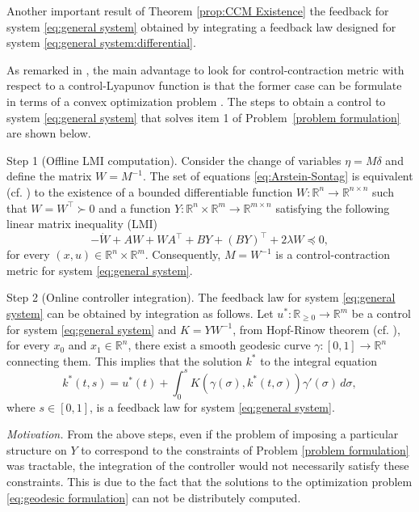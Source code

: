 \documentclass[10pt,twocolumn,twoside]{IEEEtran}
\theoremstyle{plain}
\theoremstyle{definition}
\theoremstyle{remark}
\begin{document}
Another important result of Theorem \ref{prop:CCM Existence} the feedback for system \eqref{eq:general system} obtained by integrating a feedback law designed for system \eqref{eq:general system:differential}.

As remarked in \cite{Manchester2014a}, the main advantage to look for control-contraction metric with respect to a control-Lyapunov function is that the former case can be formulate in terms of a convex optimization problem \cite{Rantzer:2001}. The steps to obtain a control to system \eqref{eq:general system} that solves item 1 of Problem~\ref{problem formulation} are shown below.

Step 1 (Offline LMI computation). Consider the change of variables $\eta=M\delta$ and define the matrix $W=M^{-1}$. The set of equations \eqref{eq:Arstein-Sontag} is equivalent (cf. \cite[Lemma 11.1]{CalafioreGhaoui2014}) to the existence of a bounded differentiable function $W:\mathbb{R}^n\to\mathbb{R}^{n\times n}$ such that $W=W^\top\succ0$ and a function $Y:\mathbb{R}^n\times\mathbb{R}^m\to\mathbb{R}^{m\times n}$ satisfying the following linear matrix inequality (LMI)
\begin{equation}\label{eq:LMI formulation}
	-\dot{W}+AW+WA^\top+BY+(BY)^\top+2\lambda W\preceq0,
\end{equation}
for every $(x,u)\in\mathbb{R}^n\times\mathbb{R}^m$. Consequently, $M=W^{-1}$ is a control-contraction metric for system \eqref{eq:general system}.

Step 2 (Online controller integration). The feedback law for system \eqref{eq:general system} can be obtained by integration as follows. Let $u^\ast:\mathbb{R}_{\geq0}\to\mathbb{R}^m$ be a control for system \eqref{eq:general system} and $K=YW^{-1}$, from Hopf-Rinow theorem (cf. \cite[Theorem 7.7]{Boothby1986}), for every $x_0$ and $x_1\in\mathbb{R}^n$, there exist a smooth geodesic curve $\gamma:[0,1]\to\mathbb{R}^n$ connecting them. This implies that the solution $k^\ast$ to the integral equation
\begin{equation}\label{eq:contracting feedback law}
	k^\ast(t,s)=u^\ast(t)+\int_0^s K(\gamma(\sigma),k^\ast(t,\sigma))\gamma'(\sigma)\,d\sigma,
\end{equation}
where $s\in[0,1]$, is a feedback law for system \eqref{eq:general system}.

{\itshape Motivation.} From the above steps, even if the problem of imposing a particular structure on $Y$ to correspond to the constraints of Problem \ref{problem formulation} was tractable, the integration of the controller would not necessarily satisfy these constraints. This is due to the fact that the solutions to the optimization problem \eqref{eq:geodesic formulation} can not be distributely computed.
\end{document}
